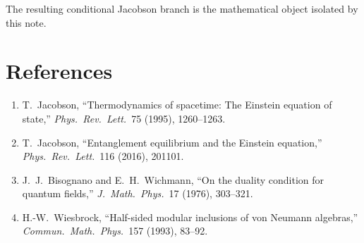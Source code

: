 \documentclass[10pt]{article}
\begin{document}
The resulting conditional Jacobson branch is the mathematical object isolated by this note.

\section*{References}

\begingroup\small
\begin{enumerate}[leftmargin=1.8em,itemsep=0.15em]
\item T.~Jacobson, ``Thermodynamics of spacetime: The Einstein equation of state,'' \emph{Phys.\ Rev.\ Lett.}\ 75 (1995), 1260--1263.
\item T.~Jacobson, ``Entanglement equilibrium and the Einstein equation,'' \emph{Phys.\ Rev.\ Lett.}\ 116 (2016), 201101.
\item J.~J.~Bisognano and E.~H.~Wichmann, ``On the duality condition for quantum fields,'' \emph{J.\ Math.\ Phys.}\ 17 (1976), 303--321.
\item H.-W.~Wiesbrock, ``Half-sided modular inclusions of von Neumann algebras,'' \emph{Commun.\ Math.\ Phys.}\ 157 (1993), 83--92.
\end{enumerate}
\endgroup
\end{document}
